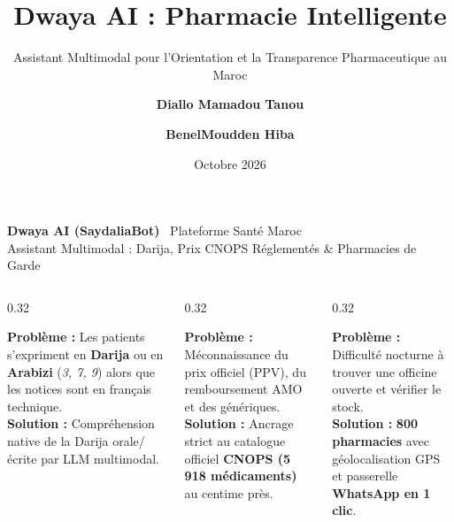 \documentclass[aspectratio=169,10pt]{beamer}
\title{\textbf{Dwaya AI : Pharmacie Intelligente}}
\subtitle{Assistant Multimodal pour l'Orientation et la Transparence Pharmaceutique au Maroc}
\author{\textbf{Diallo Mamadou Tanou} \and \textbf{BenelMoudden Hiba}}
\institute{Challenge \#1 (Assistant Pharmacie) \& Challenge \#2 (Vision \& Reconnaissance Boîte)}
\date{Octobre 2026}
\begin{document}
\begin{frame}[plain]
    \vspace{0.3cm}
    \begin{tcolorbox}[colback=primary,colframe=primary,arc=3mm,left=5mm,right=5mm,top=3mm,bottom=3mm]
        \color{white}
        {\LARGE \textbf{Dwaya AI (SaydaliaBot)}} \hfill {\small \faHospital~Plateforme Santé Maroc} \\[1mm]
        {\small Assistant Multimodal : Darija, Prix CNOPS Réglementés \& Pharmacies de Garde}
    \end{tcolorbox}

    \vspace{0.2cm}
    \begin{columns}[T]
        \begin{column}{0.32\textwidth}
            \begin{tcolorbox}[colback=white,colframe=primary,arc=2mm,title={\footnotesize \textbf{\faComments~1. Barrière Linguistique}},coltitle=white]
                \scriptsize
                \textbf{Problème :} Les patients s'expriment en \textbf{Darija} ou en \textbf{Arabizi} (\textit{3, 7, 9}) alors que les notices sont en français technique. \\[1mm]
                \textbf{Solution :} Compréhension native de la Darija orale/écrite par LLM multimodal.
            \end{tcolorbox}
        \end{column}

        \begin{column}{0.32\textwidth}
            \begin{tcolorbox}[colback=white,colframe=secondary,arc=2mm,title={\footnotesize \textbf{\faPills~2. Opacité des Prix}},coltitle=white]
                \scriptsize
                \textbf{Problème :} Méconnaissance du prix officiel (PPV), du remboursement AMO et des génériques. \\[1mm]
                \textbf{Solution :} Ancrage strict au catalogue officiel \textbf{CNOPS (5 918 médicaments)} au centime près.
            \end{tcolorbox}
        \end{column}

        \begin{column}{0.32\textwidth}
            \begin{tcolorbox}[colback=white,colframe=accent,arc=2mm,title={\footnotesize \textbf{\faClock~3. Urgence des Gardes}},coltitle=white]
                \scriptsize
                \textbf{Problème :} Difficulté nocturne à trouver une officine ouverte et vérifier le stock. \\[1mm]
                \textbf{Solution :} \textbf{800 pharmacies} avec géolocalisation GPS et passerelle \textbf{WhatsApp en 1 clic}.
            \end{tcolorbox}
        \end{column}
    \end{columns}


\end{frame}
\end{document}
